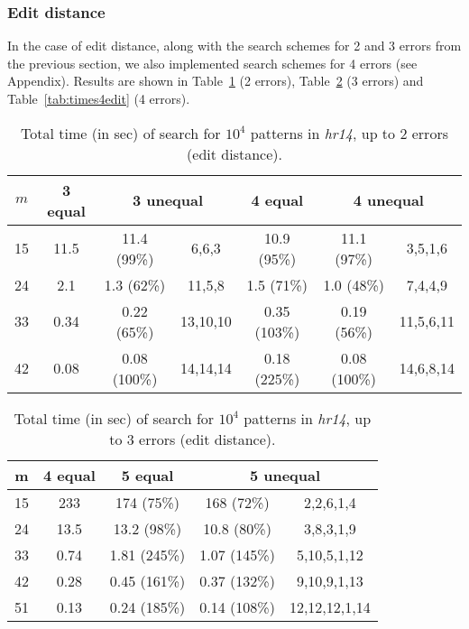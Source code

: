 \documentclass[12pt]{article}
\begin{document}
\subsubsection{Edit distance}

In the case of edit distance, along with the search schemes for 2 and
3 errors from the previous section, we also implemented search schemes
for 4 errors (see Appendix). 
Results are shown in Table~\ref{tab:times2edit} (2 errors),
Table~\ref{tab:times3edit} (3 errors) and
Table~\ref{tab:times4edit} (4 errors). 


\begin{table}[!tb]
\caption{Total time (in sec) of search for $10^4$ patterns
in \emph{hr14}, up to 2 errors (edit distance).
\label{tab:times2edit}}
\centering
\begin{tabular}{|c|c|c|c|c|c|c|}
\hline
$m$ & 3 equal & \multicolumn{2}{|c|}{3 unequal} & 4 equal & \multicolumn{2}{|c|}{4 unequal} \\
\hline
15 & 11.5 & 11.4 (99\%) & 6,6,3 & 10.9 (95\%) & 11.1 (97\%) & 3,5,1,6 \\
24 & 2.1 & 1.3 (62\%)  & 11,5,8 & 1.5 (71\%) & 1.0 (48\%) & 7,4,4,9 \\
33 & 0.34  & 0.22 (65\%)   & 13,10,10 & 0.35 (103\%)  & 0.19 (56\%) & 11,5,6,11 \\
42 & 0.08  & 0.08 (100\%)  & 14,14,14 & 0.18 (225\%)  & 0.08 (100\%) & 14,6,8,14 \\
\hline
\end{tabular}
\end{table}



\begin{table}[!tb]
\caption{Total time (in sec) of search for $10^4$ patterns
  in \emph{hr14}, up to 3 errors (edit distance).
\label{tab:times3edit}}
\centering
\begin{tabular}{|c|c|c|c|c|}
\hline
m & 4 equal & 5 equal & \multicolumn{2}{|c|}{5 unequal} \\
\hline
15 & 233 & 174 (75\%) & 168 (72\%) & 2,2,6,1,4 \\
24 & 13.5 & 13.2 (98\%) & 10.8 (80\%) & 3,8,3,1,9 \\
33 & 0.74 & 1.81 (245\%) & 1.07 (145\%) & 5,10,5,1,12 \\
42 & 0.28 & 0.45 (161\%) & 0.37 (132\%) & 9,10,9,1,13 \\
51 & 0.13 & 0.24 (185\%) & 0.14 (108\%) & 12,12,12,1,14 \\
\hline
\end{tabular}
\end{table}
\end{document}
